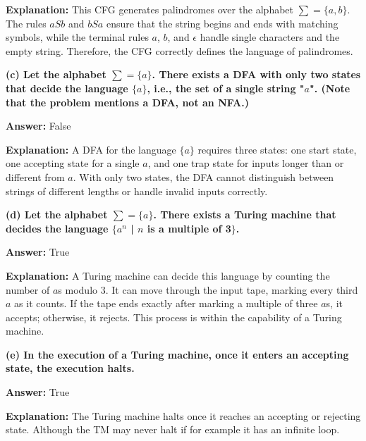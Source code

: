 \documentclass[11pt, letterpaper]{article}
\begin{document}
\noindent \textbf{Explanation:} This CFG generates palindromes over the alphabet $\sum = \{a,b\}$. The rules $aSb$ and $bSa$ ensure that the string begins and ends with matching symbols, while the terminal rules $a$, $b$, and $\epsilon$ handle single characters and the empty string. Therefore, the CFG correctly defines the language of palindromes.

\vspace{5mm}

\noindent \textbf{(c) Let the alphabet $\sum = \{a\}$. There exists a DFA with only two states that decide the language $\{a\}$, i.e., the set of a single string "$a$". (Note that the problem mentions a DFA, not an NFA.)}

\vspace{2mm}

\noindent\textbf{Answer:} False

\noindent \textbf{Explanation:} A DFA for the language $\{a\}$ requires three states: one start state, one accepting state for a single $a$, and one trap state for inputs longer than or different from $a$. With only two states, the DFA cannot distinguish between strings of different lengths or handle invalid inputs correctly.

\vspace{5mm}

\noindent \textbf{(d) Let the alphabet $\sum = \{a\}$. There exists a Turing machine that decides the language $\{a^n$ | $n$ is a multiple of 3$\}$.}

\vspace{2mm}

\noindent\textbf{Answer:} True

\noindent \textbf{Explanation:} A Turing machine can decide this language by counting the number of $a$s modulo 3. It can move through the input tape, marking every third $a$ as it counts. If the tape ends exactly after marking a multiple of three $a$s, it accepts; otherwise, it rejects. This process is within the capability of a Turing machine.

\vspace{5mm}

\noindent \textbf{(e) In the execution of a Turing machine, once it enters an accepting state, the execution halts.}

\vspace{2mm}

\noindent\textbf{Answer:} True

\noindent \textbf{Explanation:} The Turing machine halts once it reaches an accepting or rejecting state. Although the TM may never halt if for example it has an infinite loop.
\end{document}
